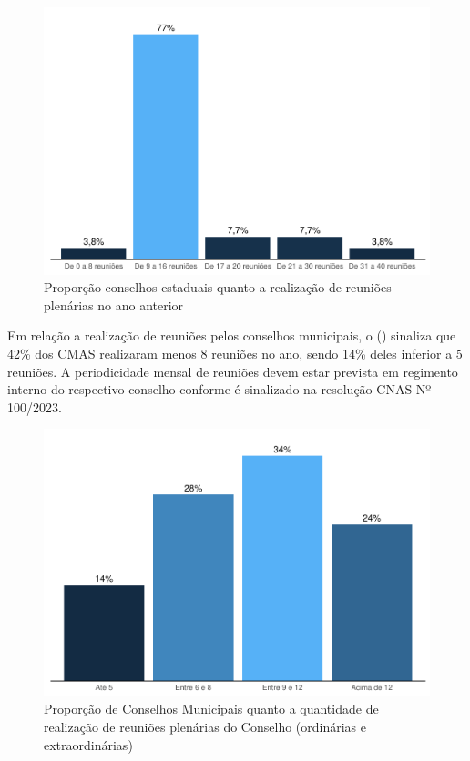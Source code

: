\documentclass[
  brazilian]{report}
\begin{document}
\begin{figure}
\includegraphics{Censo-SUAS-2022_files/figure-latex/qtdceas_reuniao-1} \caption[Proporção conselhos estaduais quanto a realização de reuniões plenárias no ano anterior]{Proporção conselhos estaduais quanto a realização de reuniões plenárias no ano anterior}\label{fig:qtdceas_reuniao}
\end{figure}

Em relação a realização de reuniões pelos conselhos municipais, o
() sinaliza que 42\% dos CMAS realizaram menos
8 reuniões no ano, sendo 14\% deles inferior a 5 reuniões. A
periodicidade mensal de reuniões devem estar prevista em regimento
interno do respectivo conselho conforme é sinalizado na resolução CNAS
Nº 100/2023.

\begin{figure}
\includegraphics{Censo-SUAS-2022_files/figure-latex/qtdcmas_reuniao-1} \caption[Proporção de Conselhos Municipais quanto a quantidade de realização de reuniões plenárias do Conselho (ordinárias e extraordinárias)]{Proporção de Conselhos Municipais quanto a quantidade de realização de reuniões plenárias do Conselho (ordinárias e extraordinárias)}\label{fig:qtdcmas_reuniao}
\end{figure}
\end{document}
